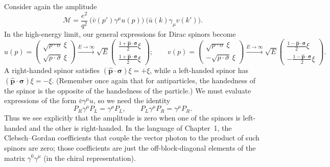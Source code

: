 Consider again the amplitude
\begin{equation}
  \mathcal{M} = \frac{e^2}{q^2}\
    \bigl( \bar{v}(p')\gamma^\mu u(p) \bigr)\
    \bigl( \bar{u}(k)\gamma_\mu v(k') \bigr) .
  \label{eq:5.25}
\end{equation}
In the high-energy limit, our general expressions for Dirac spinors become
\begin{equation}
  u(p) = \begin{pmatrix}
    \sqrt{p\cdot\sigma}\,\xi\\
    \sqrt{p\cdot\bar{\sigma}}\,\xi
  \end{pmatrix}
  \xrightarrow{E\to\infty}
  \sqrt{E}\begin{pmatrix}
    \frac{1+\hat{\mathbf{p}}\cdot\bm{\sigma}}{2}\xi\\
    \frac{1+\hat{\mathbf{p}}\cdot\bm{\sigma}}{2}\xi
  \end{pmatrix};\qquad
  v(p) = \begin{pmatrix}
    \sqrt{p\cdot\sigma}\,\xi\\
    -\sqrt{p\cdot\bar{\sigma}}\,\xi
  \end{pmatrix}
  \xrightarrow{E\to\infty}
  \sqrt{E}\begin{pmatrix}
    \frac{1-\hat{\mathbf{p}}\cdot\bm{\sigma}}{2}\xi\\
    -\frac{1-\hat{\mathbf{p}}\cdot\bm{\sigma}}{2}\xi
  \end{pmatrix} .
  \label{eq:5.26}
\end{equation}
A right-handed spinor satisfies $(\hat{\mathbf{p}}\cdot\bm{\sigma})\xi = +\xi$,
while a left-handed spinor has $(\hat{\mathbf{p}}\cdot\bm{\sigma})\xi = -\xi$.
(Remember once again that for antiparticles, the handedness of the spinor is
the opposite of the handedness of the particle.)  We must evaluate expressions
of the form $\bar{v}\gamma^\mu u$, so we need the identity
\begin{equation}
  P_R\gamma^\mu P_L = \gamma^\mu P_L,\qquad
  P_L\gamma^\mu P_R = \gamma^\mu P_R .
\end{equation}
Thus we see explicitly that the amplitude is zero when one of the spinors is
left-handed and the other is right-handed.  In the language of Chapter~1, the
Clebsch--Gordan coefficients that couple the vector photon to the product of
such spinors are zero; those coefficients are just the off-block-diagonal
elements of the matrix $\gamma^0\gamma^\mu$ (in the chiral representation).

